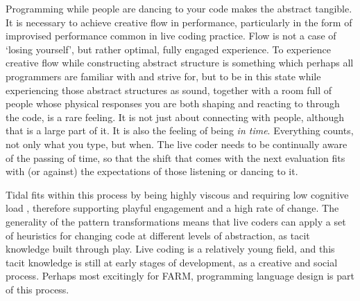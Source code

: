 \documentclass[authoryear,preprint]{sigplanconf}
\begin{document}
Programming while people are dancing to your code makes the abstract
tangible. It is necessary to achieve creative flow in performance,
particularly in the form of improvised performance common in live
coding practice. Flow is not a case of `losing yourself', but rather
optimal, fully engaged experience. To experience creative flow while
constructing abstract structure is something which perhaps all
programmers are familiar with and strive for, but to be in this state
while experiencing those abstract structures as sound,
together with a room full of people whose physical responses you are
both shaping and reacting to through the code, is a rare feeling. It
is not just about connecting with people, although that is a large
part of it. It is also the feeling of being \emph{in time}. Everything
counts, not only what you type, but when. The live coder needs to be
continually aware of the passing of time, so that the shift that comes
with the next evaluation fits with (or against) the expectations of
those listening or dancing to it.

Tidal fits within this process by being highly viscous and requiring
low cognitive load \citep{Green00}, therefore supporting playful
engagement and a high rate of change. The generality of the pattern
transformations means that live coders can apply a set of heuristics
for changing code at different levels of abstraction, as tacit
knowledge built through play. Live coding is a relatively young field,
and this tacit knowledge is still at early stages of development, as a
creative and social process. Perhaps most excitingly for FARM,
programming language design is part of this process.





\end{document}
